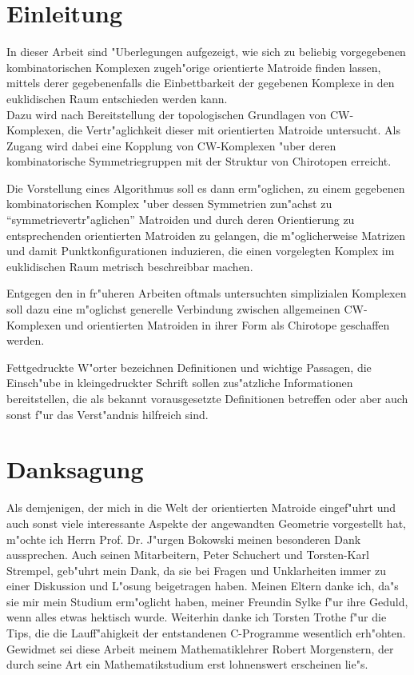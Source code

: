 \section*{Einleitung}

In dieser Arbeit sind "Uberlegungen aufgezeigt, wie sich zu beliebig
vorgegebenen kombinatorischen Komplexen zugeh"orige orientierte Matroide
finden lassen, mittels derer gegebenenfalls die Einbettbarkeit der
gegebenen Komplexe in den euklidischen Raum entschieden werden kann.\\
Dazu wird nach Bereitstellung der topologischen Grundlagen von CW-Komplexen, die
Vertr"aglichkeit dieser mit orientierten Matroide untersucht. Als Zugang wird
dabei eine Kopplung von CW-Komplexen "uber deren kombinatorische
Symmetriegruppen mit der Struktur von Chirotopen erreicht.

Die Vorstellung eines Algorithmus soll es dann erm"oglichen, zu einem gegebenen
kombinatorischen Komplex "uber dessen Symmetrien zun"achst zu
"`symmetriever\-tr"ag\-lichen"' Matroiden und durch deren Orientierung zu
entsprechenden orientierten Matroiden zu gelangen, die m"oglicherweise
Matrizen und damit Punktkonfigurationen induzieren, die einen vorgelegten
Komplex im euklidischen Raum metrisch beschreibbar machen.

Entgegen den in fr"uheren Arbeiten oftmals untersuchten simplizialen Komplexen
soll dazu eine m"oglichst generelle Verbindung zwischen allgemeinen CW-Komplexen
und orientierten Matroiden in ihrer Form als Chirotope geschaffen werden.

Fettgedruckte W"orter bezeichnen Definitionen und wichtige Passagen, die
Einsch"ube in kleingedruckter Schrift sollen zus"atzliche Informationen
bereitstellen, die als bekannt vorausgesetzte Definitionen betreffen oder
aber auch sonst f"ur das Verst"andnis hilfreich sind.

\section*{Danksagung}

Als demjenigen, der mich in die Welt der orientierten Matroide eingef"uhrt
und auch sonst viele interessante Aspekte der angewandten Geometrie vorgestellt
hat, m"ochte ich Herrn Prof. Dr. J"urgen Bokowski meinen besonderen Dank
aussprechen. Auch seinen Mitarbeitern, Peter Schuchert und Torsten-Karl Strempel,
geb"uhrt mein Dank, da sie bei Fragen und Unklarheiten immer zu einer
Diskussion und L"osung beigetragen haben. Meinen Eltern danke ich, da"s sie
mir mein Studium erm"oglicht haben, meiner Freundin Sylke f"ur ihre Geduld,
wenn alles etwas hektisch wurde. Weiterhin danke ich Torsten Trothe f"ur die
Tips, die die Lauff"ahigkeit der entstandenen C-Programme wesentlich erh"ohten.
Gewidmet sei diese Arbeit meinem Mathematiklehrer Robert Morgenstern, der
durch seine Art ein Mathematikstudium erst lohnenswert erscheinen lie"s.





\nocite{Hof:91}



\listoffigures
\printindex

